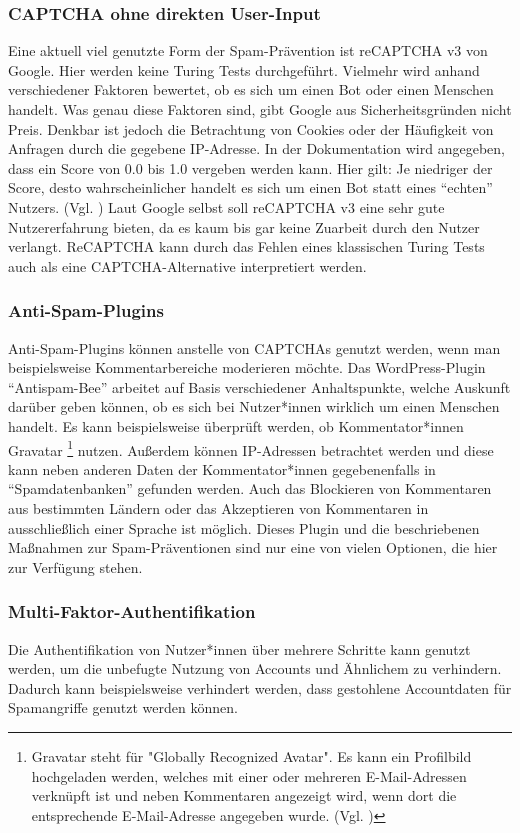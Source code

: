 \subsubsection*{CAPTCHA ohne direkten User-Input}
Eine aktuell viel genutzte Form der Spam-Prävention ist reCAPTCHA v3 von Google. 
Hier werden keine Turing Tests durchgeführt. 
Vielmehr wird anhand verschiedener Faktoren bewertet, ob es sich um einen Bot oder einen Menschen handelt.
Was genau diese Faktoren sind, gibt Google aus Sicherheitsgründen nicht Preis. 
Denkbar ist jedoch die Betrachtung von Cookies oder der Häufigkeit von Anfragen durch die gegebene IP-Adresse.
In der Dokumentation wird angegeben, dass ein Score von 0.0 bis 1.0 vergeben werden kann. 
Hier gilt: Je niedriger der Score, desto wahrscheinlicher handelt es sich um einen Bot statt eines ``echten'' Nutzers. (Vgl. \cite{recaptchadoc})
Laut Google selbst soll reCAPTCHA v3 eine sehr gute Nutzererfahrung bieten, da es kaum bis gar keine Zuarbeit durch den Nutzer verlangt. \cite{googleblog:recaptcha}
ReCAPTCHA kann durch das Fehlen eines klassischen Turing Tests auch als eine CAPTCHA-Alternative interpretiert werden.

\subsubsection*{Anti-Spam-Plugins}
Anti-Spam-Plugins können anstelle von CAPTCHAs genutzt werden, wenn man beispielsweise Kommentarbereiche moderieren möchte.
Das WordPress-Plugin ``Antispam-Bee'' arbeitet auf Basis verschiedener Anhaltspunkte, 
welche Auskunft darüber geben können, ob es sich bei Nutzer*innen wirklich um einen Menschen handelt.
Es kann beispielsweise überprüft werden, ob Kommentator*innen Gravatar
\footnote[2]{Gravatar steht für "Globally Recognized Avatar". 
Es kann ein Profilbild hochgeladen werden, welches mit einer oder mehreren E-Mail-Adressen verknüpft ist 
und neben Kommentaren angezeigt wird, wenn dort die entsprechende E-Mail-Adresse angegeben wurde. (Vgl. \cite{doku:antispambee})} nutzen.
Außerdem können IP-Adressen betrachtet werden und diese kann neben anderen Daten der Kommentator*innen gegebenenfalls in ``Spamdatenbanken'' gefunden werden.
Auch das Blockieren von Kommentaren aus bestimmten Ländern oder das Akzeptieren von Kommentaren in ausschließlich einer Sprache ist möglich.
Dieses Plugin und die beschriebenen Maßnahmen zur Spam-Präventionen sind nur eine von vielen Optionen, die hier zur Verfügung stehen.
\cite{blog:antispambee}
\cite{doku:antispambee}
\subsubsection*{Multi-Faktor-Authentifikation}
Die Authentifikation von Nutzer*innen über mehrere Schritte kann genutzt werden, um die unbefugte Nutzung von Accounts und Ähnlichem zu verhindern.
Dadurch kann beispielsweise verhindert werden, dass gestohlene Accountdaten für Spamangriffe genutzt werden können.
